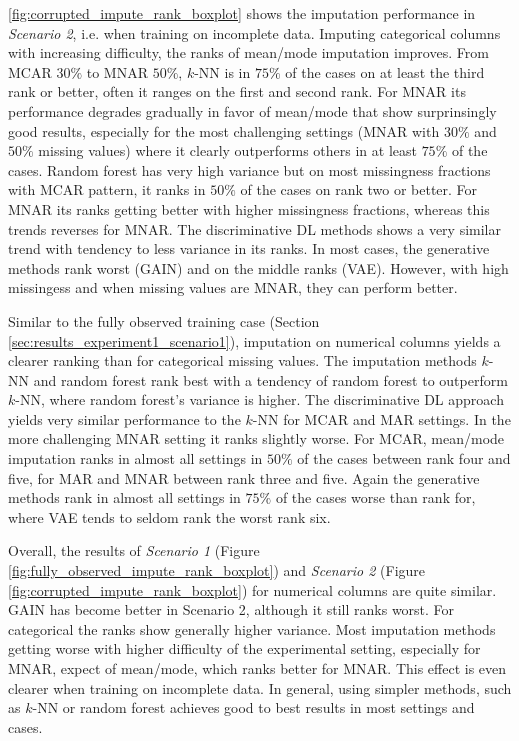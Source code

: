 \autoref{fig:corrupted_impute_rank_boxplot} shows the imputation performance in \textit{Scenario 2}, i.e. when training on incomplete data. Imputing categorical columns with increasing difficulty, the ranks of mean/mode imputation improves. From MCAR $30\%$ to MNAR $50\%$, $k$-NN is in $75\%$ of the cases on at least the third rank or better, often it ranges on the first and second rank. For MNAR its performance degrades gradually in favor of mean/mode that show surprinsingly good results, especially for the most challenging settings (MNAR with $30\%$ and $50\%$ missing values) where it clearly outperforms others in at least $75\%$ of the cases. Random forest has very high variance but on most missingness fractions with MCAR pattern, it ranks in $50\%$ of the cases on rank two or better. For MNAR its ranks getting better with higher missingness fractions, whereas this trends reverses for MNAR. The discriminative DL methods shows a very similar trend with tendency to less variance in its ranks. In most cases, the generative methods rank worst (GAIN) and on the middle ranks (VAE). However, with high missingess and when missing values are MNAR, they can perform better.

Similar to the fully observed training case (Section \ref{sec:results_experiment1_scenario1}), imputation on numerical columns yields a clearer ranking than for categorical missing values. The imputation methods $k$-NN and random forest rank best with a tendency of random forest to outperform $k$-NN, where random forest's variance is higher. The discriminative DL approach yields very similar performance to the $k$-NN for MCAR and MAR settings. In the more challenging MNAR setting it ranks slightly worse. For MCAR, mean/mode imputation ranks in almost all settings in $50\%$ of the cases between rank four and five, for MAR and MNAR between rank three and five. Again the generative methods rank in almost all settings in $75\%$ of the cases worse than rank for, where VAE tends to seldom rank the worst rank six.

Overall, the results of \textit{Scenario 1} (Figure \ref{fig:fully_observed_impute_rank_boxplot}) and \textit{Scenario 2} (Figure \ref{fig:corrupted_impute_rank_boxplot}) for numerical columns are quite similar. GAIN has become better in Scenario 2, although it still ranks worst. For categorical the ranks show generally higher variance. Most imputation methods getting worse with higher difficulty of the experimental setting, especially for MNAR, expect of mean/mode, which ranks better for MNAR. This effect is even clearer when training on incomplete data. In general, using simpler methods, such as $k$-NN or random forest achieves good to best results in most settings and cases.


